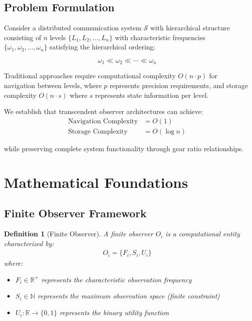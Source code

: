 \documentclass[12pt,a4paper]{article}
\newtheorem{definition}{Definition}
\begin{document}
\subsection{Problem Formulation}

Consider a distributed communication system $\mathcal{S}$ with hierarchical structure consisting of $n$ levels $\{L_1, L_2, \ldots, L_n\}$ with characteristic frequencies $\{\omega_1, \omega_2, \ldots, \omega_n\}$ satisfying the hierarchical ordering:

\begin{equation}
\omega_1 \ll \omega_2 \ll \cdots \ll \omega_n
\label{eq:hierarchical_ordering}
\end{equation}

Traditional approaches require computational complexity $O(n \cdot p)$ for navigation between levels, where $p$ represents precision requirements, and storage complexity $O(n \cdot s)$ where $s$ represents state information per level.

We establish that transcendent observer architectures can achieve:
\begin{align}
\text{Navigation Complexity} &= O(1) \\
\text{Storage Complexity} &= O(\log n)
\end{align}

while preserving complete system functionality through gear ratio relationships.

\section{Mathematical Foundations}

\subsection{Finite Observer Framework}

\begin{definition}[Finite Observer]
A finite observer $O_i$ is a computational entity characterized by:
\begin{align}
O_i = \{F_i, S_i, U_i\}
\end{align}
where:
\begin{itemize}
\item $F_i \in \mathbb{R}^+$ represents the characteristic observation frequency
\item $S_i \in \mathbb{N}$ represents the maximum observation space (finite constraint)
\item $U_i: \mathbb{R} \to \{0,1\}$ represents the binary utility function
\end{itemize}
\end{definition}
\end{document}

